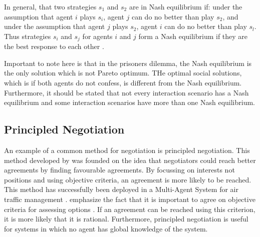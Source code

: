 In general, that two strategies $s_1$ and $s_2$ are in Nash equilibrium if: under the assumption that agent $i$ plays $s_i$, agent $j$ can do no better than play $s_2$, and under the assumption that agent $j$ plays $s_2$, agent $i$ can do no better than play $s_l$. Thus strategies $s_i$ and $s_j$ for agents $i$ and $j$ form a Nash equilibrium if they are the best response to each other  \citep{wooldridge2009introduction}. 

Important to note here is that in the prisoners dilemma, the Nash equilibrium is the only solution which is not Pareto optimum.  THe optimal social solutions, which is if both agents do not confess, is different from the Nash equilibrium.  Furthermore, it should be stated that not every interaction scenario has a Nash equilibrium and some interaction scenarios have more than one Nash equilibrium. 
\subsection{Principled Negotiation}
\label{sec:principlednegotiation}
An example of a common method for negotiation is principled negotiation. This method developed by \citet{fisher1987getting} was founded on the idea that negotiators could reach better agreements by finding favourable agreements. By focussing on interests not positions and using objective criteria, an agreement is more likely to be reached. This method has successfully been deployed in a Multi-Agent System for air traffic management \citep{wangermann1998principled}. \citet{fisher1987getting} emphasize the fact that it is important to agree on objective criteria for assessing options \citep{fisher1987getting}. If an agreement can be reached using this criterion, it is more likely that it is rational. Furthermore, principled negotiation is useful for systems in which no agent has global knowledge of the system. 








